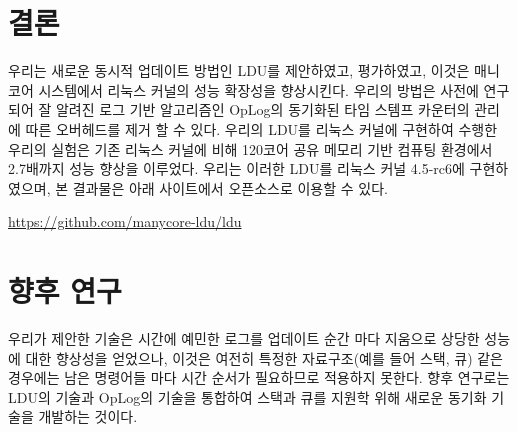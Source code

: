
\section{결론}
우리는 새로운 동시적 업데이트 방법인 LDU를 제안하였고, 평가하였고, 
이것은 매니코어 시스템에서 리눅스 커널의 성능 확장성을 향상시킨다.
우리의 방법은 사전에 연구되어 잘 알려진 로그 기반 알고리즘인 OpLog의 동기화된 타임
 스템프 카운터의 관리에 따른 오버헤드를 제거 할 수 있다. 
우리의 LDU를 리눅스 커널에 구현하여 수행한 우리의 실험은 기존 리눅스 커널에 비해 120코어 
공유 메모리 기반 컴퓨팅 환경에서 2.7배까지 성능 향상을 이루었다. 
우리는 이러한 LDU를 리눅스 커널 4.5-rc6에 구현하였으며, 본 결과물은
아래 사이트에서 오픈소스로 이용할 수 있다.
\begin{center}
\url{https://github.com/manycore-ldu/ldu}
\end{center}

\newpage
\section{향후 연구}
우리가 제안한 기술은 시간에 예민한 로그를 업데이트 순간 마다 지움으로
 상당한 성능에 대한 향상성을 얻었으나, 이것은 여전히 특정한 자료구조(예를 들어 스택, 큐)
  같은 경우에는 남은 명령어들 마다 시간 순서가 필요하므로 적용하지 못한다.
향후 연구로는 LDU의 기술과 OpLog의 기술을 통합하여 스택과 큐를 지원학 위해
 새로운 동기화 기술을 개발하는 것이다. 


